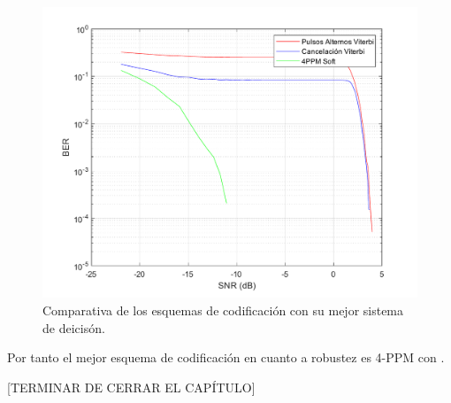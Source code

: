 \begin{figure}[ht]
    \centering
    \includegraphics[scale=0.6]{./figuras/Comparativa.pdf}
    \caption{\small{Comparativa de los esquemas de codificación con su mejor sistema de deicisón.}}
    \label{comparativa}%
\end{figure}

Por tanto el mejor esquema de codificación en cuanto a robustez es 4-PPM con 
.

[TERMINAR DE CERRAR EL CAPÍTULO]

\chapterend{}
